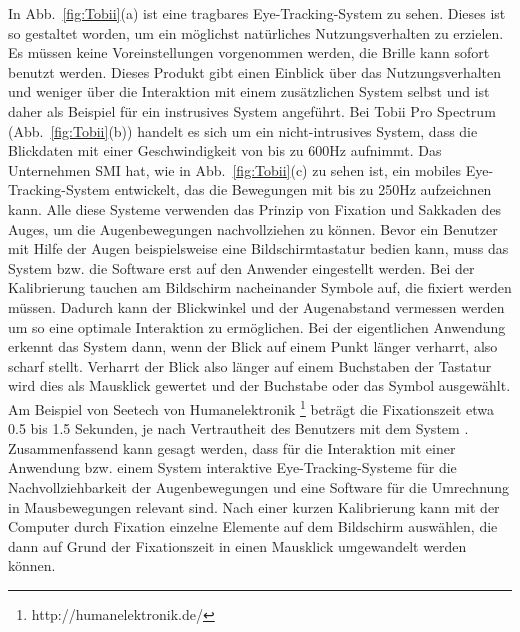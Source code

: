 \newline \newline
In Abb.~\ref{fig:Tobii}(a) ist eine tragbares Eye-Tracking-System zu sehen. Dieses ist so gestaltet worden, um ein möglichst natürliches Nutzungsverhalten zu erzielen. Es müssen keine Voreinstellungen vorgenommen werden, die Brille kann sofort benutzt werden. Dieses Produkt gibt einen Einblick über das Nutzungsverhalten und weniger über die Interaktion mit einem zusätzlichen System selbst und ist daher als Beispiel für ein instrusives System angeführt. Bei Tobii Pro Spectrum (Abb.~\ref{fig:Tobii}(b)) handelt es sich um ein nicht-intrusives System, dass die Blickdaten mit einer Geschwindigkeit von bis zu 600Hz aufnimmt. Das Unternehmen SMI hat, wie in Abb.~\ref{fig:Tobii}(c) zu sehen ist, ein mobiles Eye-Tracking-System entwickelt, das die Bewegungen mit bis zu 250Hz aufzeichnen kann. 
Alle diese Systeme verwenden das Prinzip von Fixation und Sakkaden des Auges, um die Augenbewegungen nachvollziehen zu können.
\newline \newline
Bevor ein Benutzer mit Hilfe der Augen beispielsweise eine Bildschirmtastatur bedien kann, muss das System bzw. die Software erst auf den Anwender eingestellt werden. Bei der Kalibrierung tauchen am Bildschirm nacheinander Symbole auf, die fixiert werden müssen. Dadurch kann der Blickwinkel und der Augenabstand vermessen werden um so eine optimale Interaktion zu ermöglichen. 
Bei der eigentlichen Anwendung erkennt das System dann, wenn der Blick auf einem Punkt länger verharrt, also scharf stellt. Verharrt der Blick also länger auf einem Buchstaben der Tastatur wird dies als Mausklick gewertet und der Buchstabe oder das Symbol ausgewählt. Am Beispiel von Seetech von Humanelektronik %
\footnote{http://humanelektronik.de/}
%
beträgt die Fixationszeit etwa 0.5 bis 1.5 Sekunden, je nach Vertrautheit des Benutzers mit dem System \cite{SEETECH}.
\newline \newline \newline
Zusammenfassend kann gesagt werden, dass für die Interaktion mit einer Anwendung bzw. einem System interaktive Eye-Tracking-Systeme für die Nachvollziehbarkeit der Augenbewegungen und eine Software für die Umrechnung in Mausbewegungen relevant sind. Nach einer kurzen Kalibrierung kann mit der Computer durch Fixation einzelne Elemente auf dem Bildschirm auswählen, die dann auf Grund der Fixationszeit in einen Mausklick umgewandelt werden können.

